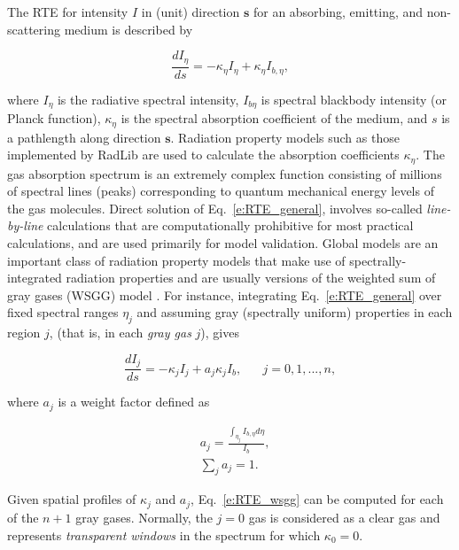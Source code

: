 \documentclass[preprint,12pt, a4paper]{elsarticle}
\begin{document}
The RTE for intensity $I$ in (unit) direction $\mathbf{s}$ for an absorbing, emitting, and non-scattering medium is described by
% 
\begin{linenomath}
\begin{equation} \label{e:RTE_general}
    \frac{dI_{\eta}}{ds} = -\kappa_{\eta}I_{\eta} + \kappa_{\eta}I_{b,\eta},
\end{equation}
\end{linenomath}
%
where $I_{\eta}$ is the radiative spectral intensity, 
$I_{b\eta}$ is spectral blackbody intensity (or Planck function), 
$\kappa_{\eta}$ is the spectral absorption coefficient of the medium, and $s$ is a pathlength along direction $\mathbf{s}$. Radiation property models such as those implemented by RadLib are used to calculate the absorption coefficients $\kappa_{\eta}$. 
%
The gas absorption spectrum is an extremely complex function consisting of millions of spectral lines (peaks) corresponding to quantum mechanical energy levels of the gas molecules.
Direct solution of Eq.~\ref{e:RTE_general}, involves so-called \emph{line-by-line} calculations that are computationally prohibitive for most practical calculations, and are used primarily for model validation. Global models are an important class of radiation property models that make use of spectrally-integrated radiation properties and are usually versions of the weighted sum of gray gases (WSGG) model \cite{Hottel_1967,Modest_2013}. For instance, integrating Eq.~\ref{e:RTE_general} over fixed spectral ranges $\eta_j$ and assuming gray (spectrally uniform) properties in each region $j$, (that is, in each \emph{gray gas} $j$), gives
%
\begin{linenomath}
\begin{equation} \label{e:RTE_wsgg}
	\frac{dI_j}{ds} = -\kappa_jI_j + a_j\kappa_jI_b, \hspace{20pt} j=0,1,...,n,
\end{equation}
\end{linenomath}
%
where $a_j$ is a weight factor defined as
%
\begin{linenomath}
\begin{align}
    &a_j= \frac{\int_{\eta_j}I_{b,\eta}d\eta}{I_b},\\
    &\sum_j a_j = 1.
\end{align}
\end{linenomath}
%
Given spatial profiles of $\kappa_j$ and $a_j$, Eq.~\ref{e:RTE_wsgg} can be computed for each of the $n+1$ gray gases. Normally, the $j=0$ gas is considered as a clear gas and represents \emph{transparent windows} in the spectrum for which $\kappa_0=0$.
\end{document}
